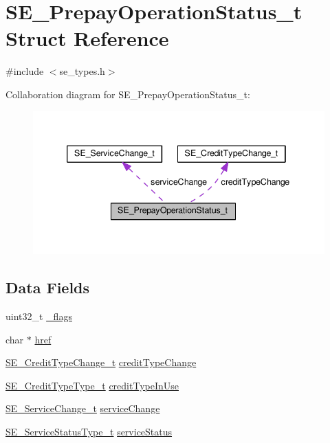 \hypertarget{structSE__PrepayOperationStatus__t}{}\section{S\+E\+\_\+\+Prepay\+Operation\+Status\+\_\+t Struct Reference}
\label{structSE__PrepayOperationStatus__t}


{\ttfamily \#include $<$se\+\_\+types.\+h$>$}



Collaboration diagram for S\+E\+\_\+\+Prepay\+Operation\+Status\+\_\+t\+:\nopagebreak
\begin{figure}[H]
\begin{center}
\leavevmode
\includegraphics[width=339pt]{structSE__PrepayOperationStatus__t__coll__graph}
\end{center}
\end{figure}
\subsection*{Data Fields}
\begin{DoxyCompactItemize}
\item 
uint32\+\_\+t \hyperlink{group__PrepayOperationStatus_ga5f61a74f1a28ce905aa0c45ecf150704}{\+\_\+flags}
\item 
char $\ast$ \hyperlink{group__PrepayOperationStatus_ga4111baa24c3cf308caa4879263d9354e}{href}
\item 
\hyperlink{structSE__CreditTypeChange__t}{S\+E\+\_\+\+Credit\+Type\+Change\+\_\+t} \hyperlink{group__PrepayOperationStatus_ga585930db1ced44829ce2699542c605da}{credit\+Type\+Change}
\item 
\hyperlink{group__CreditTypeType_ga5a63742e5c65087df17ed6ad8f420b5e}{S\+E\+\_\+\+Credit\+Type\+Type\+\_\+t} \hyperlink{group__PrepayOperationStatus_ga931c94832d59d1ab3b0940fcf20bb956}{credit\+Type\+In\+Use}
\item 
\hyperlink{structSE__ServiceChange__t}{S\+E\+\_\+\+Service\+Change\+\_\+t} \hyperlink{group__PrepayOperationStatus_ga3934e843a26a66a371d3fc0e867d8238}{service\+Change}
\item 
\hyperlink{group__ServiceStatusType_gaa3cd725afc87388d65acf81254caee7d}{S\+E\+\_\+\+Service\+Status\+Type\+\_\+t} \hyperlink{group__PrepayOperationStatus_ga14485626368fa2177e115ed7117f2338}{service\+Status}
\end{DoxyCompactItemize}


